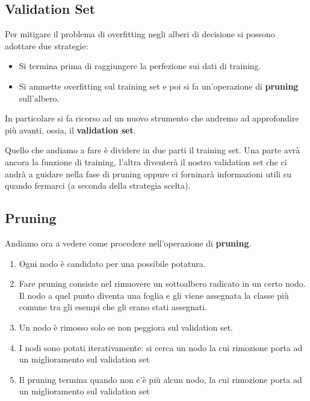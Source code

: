 \subsection{Validation Set}
Per mitigare il problema di overfitting negli alberi di decisione si possono adottare due strategie:
\begin{itemize}
	\item Si termina prima di raggiungere la perfezione sui dati di training.
	\item Si ammette overfitting sul training set e poi si fa un'operazione di \textbf{pruning} sull'albero.
\end{itemize}
In particolare si fa ricorso ad un nuovo strumento che andremo ad approfondire pi\`u avanti, ossia, il
\textbf{validation set}.

Quello che andiamo a fare \`e dividere in due parti il training set. Una parte avr\`a ancora la funzione di training,
l'altra diventer\`a il nostro validation set che ci andr\`a a guidare nella fase di pruning oppure ci forninar\`a
informazioni utili su quando fermarci (a seconda della strategia scelta).

\subsection{Pruning}
Andiamo ora a vedere come procedere nell'operazione di \textbf{pruning}.
\begin{enumerate}
	\item Ogni nodo \`e candidato per una possibile potatura.
	\item Fare pruning consiste nel rimuovere un sottoalbero radicato in un certo nodo. Il nodo a quel punto diventa una
	      foglia e gli viene assegnata la classe pi\`u comune tra gli esempi che gli erano stati assegnati.
	\item Un nodo \`e rimosso solo se non peggiora sul validation set.
	\item I nodi sono potati iterativamente: si cerca un nodo la cui rimozione porta ad un miglioramento sul validation
	      set
	\item Il pruning termina quando non c'\`e pi\`u alcun nodo, la cui rimozione porta ad un miglioramento sul validation
	      set
\end{enumerate}